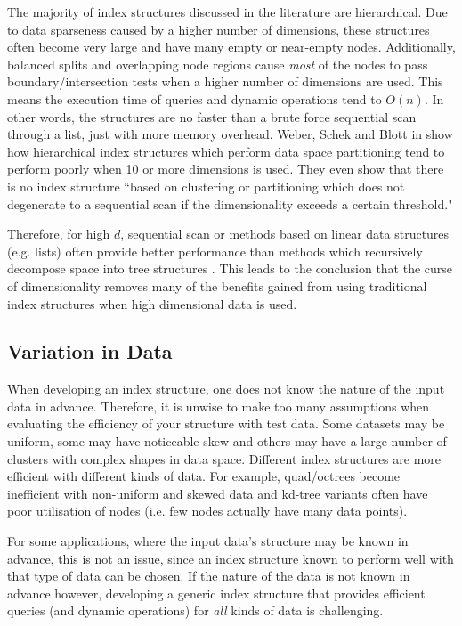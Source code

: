 The majority of index structures discussed in the literature are hierarchical. Due to data sparseness caused by a higher number of dimensions, these structures often become very large and have many empty or near-empty nodes. Additionally, balanced splits and overlapping node regions cause \textit{most} of the nodes to pass boundary/intersection tests when a higher number of dimensions are used. This means the execution time of queries and dynamic operations tend to $O(n)$. In other words, the structures are no faster than a brute force sequential scan through a list, just with more memory overhead. Weber, Schek and Blott in \cite{va-file} show how hierarchical index structures which perform data space partitioning tend to perform poorly when 10 or more dimensions is used. They even show that there is no index structure ``based on clustering or partitioning which does not degenerate to a sequential scan if the dimensionality exceeds a certain threshold."

Therefore, for high $d$, sequential scan or methods based on linear data structures (e.g. lists) often provide better performance than methods which recursively decompose space into tree structures \cite{md-structures-samet}. This leads to the conclusion that the curse of dimensionality removes many of the benefits gained from using traditional index structures when high dimensional data is used.

\subsection{Variation in Data}

When developing an index structure, one does not know the nature of the input data in advance. Therefore, it is unwise to make too many assumptions when evaluating the efficiency of your structure with test data. Some datasets may be uniform, some may have noticeable skew and others may have a large number of clusters with complex shapes in data space. Different index structures are more efficient with different kinds of data. For example, quad/octrees become inefficient with non-uniform and skewed data and kd-tree variants often have poor utilisation of nodes \cite{bkd-tree} (i.e. few nodes actually have many data points).

For some applications, where the input data's structure may be known in advance, this is not an issue, since an index structure known to perform well with that type of data can be chosen. If the nature of the data is not known in advance however, developing a generic index structure that provides efficient queries (and dynamic operations) for \textit{all} kinds of data is challenging.

